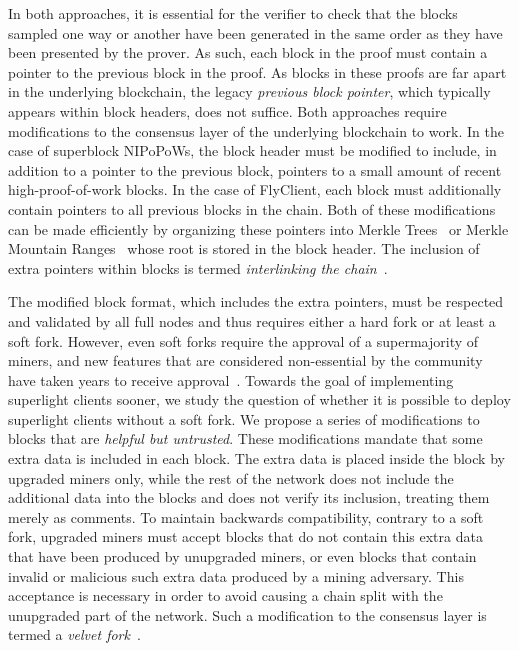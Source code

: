 In both approaches, it is essential for the verifier to check that the blocks
sampled one way or another have been generated in the same order as they have
been presented by the prover. As such, each block in the proof must contain a
pointer to the previous block in the proof. As blocks in these proofs are far
apart in the underlying blockchain, the legacy \emph{previous block pointer},
which typically appears within block headers, does not suffice.
Both approaches require modifications to the consensus layer of the underlying
blockchain to work. In the case of superblock NIPoPoWs, the block header must be
modified to include, in addition to a pointer to the previous block, pointers to
a small amount of recent high-proof-of-work blocks. In the case of FlyClient,
each block must additionally contain pointers to all previous blocks in the
chain. Both of these modifications can be made efficiently by organizing these
pointers into Merkle Trees~\cite{merkle} or Merkle Mountain Ranges~\cite{ct,mmr}
whose root is stored in the block header. The inclusion of extra pointers within
blocks is termed \emph{interlinking the chain}~\cite{pow}.

The modified block format, which includes the extra pointers, must be respected
and validated by all full nodes and thus requires either a hard fork or at least
a soft fork. However, even soft forks require the approval of a supermajority of
miners, and new features that are considered non-essential by the community have
taken years to receive approval~\cite{segwit}. Towards the goal of implementing
superlight clients sooner, we study the question of whether it is possible to
deploy superlight clients without a soft fork. We propose a series of
modifications to blocks that are \emph{helpful but untrusted}. These
modifications mandate that some extra data is included in each block. The extra
data is placed inside the block by upgraded miners only, while the rest of the
network does not include the additional data into the blocks and does not verify
its inclusion, treating them merely as comments. To maintain backwards
compatibility, contrary to a soft fork, upgraded miners must accept blocks that
do not contain this extra data that have been produced by unupgraded miners, or
even blocks that contain invalid or malicious such extra data produced by a
mining adversary. This acceptance is necessary in order to avoid causing a chain
split with the unupgraded part of the network. Such a modification to the
consensus layer is termed a \emph{velvet fork}~\cite{velvet}.

